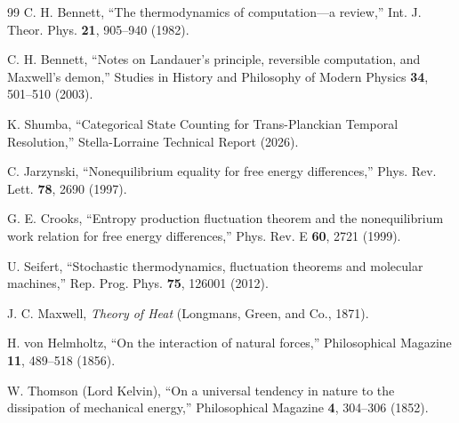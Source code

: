\begin{thebibliography}{99}
 C. H. Bennett, ``The thermodynamics of computation---a review,'' Int. J. Theor. Phys. \textbf{21}, 905--940 (1982).

 C. H. Bennett, ``Notes on Landauer's principle, reversible computation, and Maxwell's demon,'' Studies in History and Philosophy of Modern Physics \textbf{34}, 501--510 (2003).

 K. Shumba, ``Categorical State Counting for Trans-Planckian Temporal Resolution,'' Stella-Lorraine Technical Report (2026).

 C. Jarzynski, ``Nonequilibrium equality for free energy differences,'' Phys. Rev. Lett. \textbf{78}, 2690 (1997).

 G. E. Crooks, ``Entropy production fluctuation theorem and the nonequilibrium work relation for free energy differences,'' Phys. Rev. E \textbf{60}, 2721 (1999).

 U. Seifert, ``Stochastic thermodynamics, fluctuation theorems and molecular machines,'' Rep. Prog. Phys. \textbf{75}, 126001 (2012).

 J. C. Maxwell, \textit{Theory of Heat} (Longmans, Green, and Co., 1871).

 H. von Helmholtz, ``On the interaction of natural forces,'' Philosophical Magazine \textbf{11}, 489--518 (1856).

 W. Thomson (Lord Kelvin), ``On a universal tendency in nature to the dissipation of mechanical energy,'' Philosophical Magazine \textbf{4}, 304--306 (1852).

\end{thebibliography}
